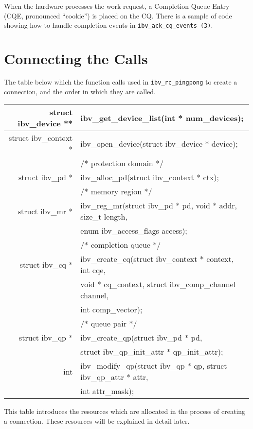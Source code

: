 \documentclass[letterpaper,12pt]{article}
\begin{document}
When the hardware processes the work request, a Completion Queue Entry
(CQE, pronounced ``cookie'') is placed on the CQ.  There is a sample of
code showing how to handle completion events in {\tt ibv\_ack\_cq\_events (3)}.

\section{Connecting the Calls} The table below which the
function calls used in {\tt ibv\_rc\_pingpong} to create a connection, and
the order in which they are called.

\begin{center}
  \begin{tabular}{  r  l  }
    \hline
    struct ibv\_device ** & ibv\_get\_device\_list(int * num\_devices); \\ \hline
    struct ibv\_context * & ibv\_open\_device(struct ibv\_device * device); \\ \hline
    & /* protection domain */  \\
    struct ibv\_pd * & ibv\_alloc\_pd(struct ibv\_context * ctx); \\ \hline
    & /* memory region */ \\
    struct ibv\_mr * & ibv\_reg\_mr(struct ibv\_pd * pd, void * addr, size\_t length, \\
     &  enum ibv\_access\_flags access); \\ \hline
    & /* completion queue */ \\
    struct ibv\_cq * & ibv\_create\_cq(struct ibv\_context * context, int cqe, \\
& void * cq\_context,
     struct ibv\_comp\_channel channel, \\
& int comp\_vector); \\ \hline
    & /* queue pair */ \\
    struct ibv\_qp * & ibv\_create\_qp(struct ibv\_pd * pd,
    \\ & struct ibv\_qp\_init\_attr * qp\_init\_attr); \\ \hline
    int & ibv\_modify\_qp(struct ibv\_qp * qp, struct ibv\_qp\_attr * attr, \\
     & int attr\_mask); \\ \hline
  \end{tabular}
\end{center}

This table introduces the resources which are allocated in
the process of creating a connection. These resources will be
explained in detail later.
\end{document}
